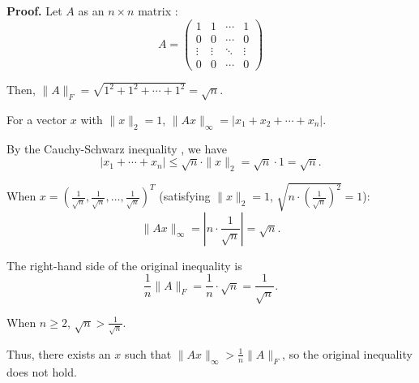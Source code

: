 \documentclass[a4paper, 11pt]{article}
\newenvironment{solution}
    {\textbf{Proof.}}
    {}
\begin{document}
\begin{solution}
Let \( A \) as an \( n \times n \) matrix : 
$$
A = \begin{pmatrix} 
	1 & 1 & \cdots & 1 \\
	0 & 0 & \cdots & 0 \\
	\vdots & \vdots & \ddots & \vdots \\
	0 & 0 & \cdots & 0 
\end{pmatrix}
$$

Then, \( \|A\|_F = \sqrt{1^2 + 1^2 + \cdots + 1^2} = \sqrt{n} \).
 
For a vector \( x \) with \( \|x\|_2 = 1 \), \( \|Ax\|_{\infty} = |x_1 + x_2 + \cdots + x_n| \).

By the Cauchy-Schwarz inequality , we have
$$|x_1 + \cdots + x_n| \leq \sqrt{n} \cdot \|x\|_2 = \sqrt{n} \cdot 1 = \sqrt{n} .$$

When \( x = \left( \frac{1}{\sqrt{n}}, \frac{1}{\sqrt{n}}, \dots, \frac{1}{\sqrt{n}} \right)^T \) (satisfying \( \|x\|_2 = 1 \),  \( \sqrt{n \cdot \left( \frac{1}{\sqrt{n}} \right)^2} = 1 \)):
$$
\|Ax\|_{\infty} = \left| n \cdot \frac{1}{\sqrt{n}} \right| = \sqrt{n}.
$$

The right-hand side of the original inequality is 
$$ \frac{1}{n}\|A\|_F = \frac{1}{n} \cdot \sqrt{n} = \frac{1}{\sqrt{n}} .$$

When \( n \geq 2 \), \( \sqrt{n} > \frac{1}{\sqrt{n}} \).

Thus, there exists an \( x \) such that \( \|Ax\|_{\infty} > \frac{1}{n}\|A\|_F \), so the original inequality does not hold.
\end{solution}



\end{document}
